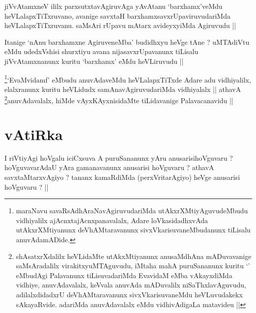 
\begin{artha}
jiVvAtamxneV ililx parxsutxtavAgiruvAga yAvAtanu `barxhamx'veMdu
heVLalapxTiTxruvano, avanige savxtaH barxhamxsavxrUpaviruvudariMda
heVLalapxTiTxruvanu. saMsAri rUpavu mAtarx avideyxyiMda Agiruvudu ||
\end{artha}


\begin{artha}
Itanige `nAnu barxhamxne AgiruveneMba' budidhxyu heVge tAne ?
uMTAdiVtu eMdu udedxVshisi shurxtiyu avana nijasavxrUpavanunx tiLisalu
jiVvAtamxnanunx kuritu `barxhamx' eMdu heVLiruvudu ||
\end{artha}


\begin{artha}
\footnote[1]{maraNavu savaRsAdhAraNavAgiruvudariMda
  utAkxrXMtiyAguvudeMbudu vidhiyalilx ajAcnxtajAcnxpanavalalx, Adare
  loVkasidadhxvAda utAkxrXMtiyanunx deVhAMtaravanunx
  sivxVkarisuvaneMbudanunx tiLisalu anuvAdamADide.}`EvaMvidamf' eMbudu anuvAdaveMdu heVLalapxTiTxde Adare
adu vidhiyalilx, elalxranunx kuritu heVLidudx samAnavAgiruvudariMda
vidhiyalalx || athavA \footnote[2]{shAsatxrXdalilx heVLidaMte
  utAkxMtiyanunx anusaMdhAna mADuvavanige saMsAradalilx
  virakitxyuMTAguvudu, iMtaha mahA puruSananunx kuritu `\stext'
  eMbudAgi Palavanunx tiLisuvadariMda EvavidaM eMba vAkayxdiMda
  vidhiye, anuvAdavalalx, keVvala anuvAda mADuvalilx
  niSaThxlavAguvudu, adilalxdidadxrU deVhAMtaravanunx
  sivxVkarisuvaneMdu heVLuvudakekx sAkayaRvide. adariMda anuvAdavalalx
eMdu vidhivAdigaLa matavideu ||}anuvAdavalalx, hiMde
vAyxKAyxnisidaMte tiLidavanige Palavacanavidu ||
\end{artha}

\section*{vAtiRka}


\begin{artha}
I riVtiyAgi hoVgalu iciCxsuva A puruSananunx yAru anusarisihoVguvaru ?
hoVguvavarAdaU yAra gamanavanunx anusarisi hoVguvaru ? athavA
savxtaMtarxvAgiyo ? tananx kamaRdiMda (perxVritarAgiyo) heVge
anusarisi hoVguvaru ? ||
\end{artha}


